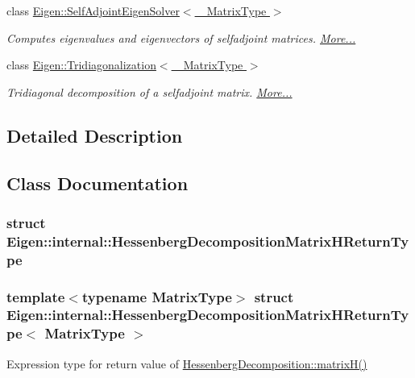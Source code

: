 \begin{DoxyCompactItemize}
class \hyperlink{group___eigenvalues___module_class_eigen_1_1_self_adjoint_eigen_solver}{Eigen\+::\+Self\+Adjoint\+Eigen\+Solver$<$ \+\_\+\+Matrix\+Type $>$}
\begin{DoxyCompactList}\small\item\em Computes eigenvalues and eigenvectors of selfadjoint matrices.  \hyperlink{group___eigenvalues___module_class_eigen_1_1_self_adjoint_eigen_solver}{More...}\end{DoxyCompactList}\item 
class \hyperlink{group___eigenvalues___module_class_eigen_1_1_tridiagonalization}{Eigen\+::\+Tridiagonalization$<$ \+\_\+\+Matrix\+Type $>$}
\begin{DoxyCompactList}\small\item\em Tridiagonal decomposition of a selfadjoint matrix.  \hyperlink{group___eigenvalues___module_class_eigen_1_1_tridiagonalization}{More...}\end{DoxyCompactList}\end{DoxyCompactItemize}


\subsection{Detailed Description}


\subsection{Class Documentation}
\label{struct_eigen_1_1internal_1_1_hessenberg_decomposition_matrix_h_return_type}
\subsubsection{struct Eigen\+:\+:internal\+:\+:Hessenberg\+Decomposition\+Matrix\+H\+Return\+Type}
\subsubsection*{template$<$typename Matrix\+Type$>$\newline
struct Eigen\+::internal\+::\+Hessenberg\+Decomposition\+Matrix\+H\+Return\+Type$<$ Matrix\+Type $>$}

Expression type for return value of \hyperlink{group___eigenvalues___module_a8e781d2e22a2304647bcf0ae913cc8ea}{Hessenberg\+Decomposition\+::matrix\+H()} 



